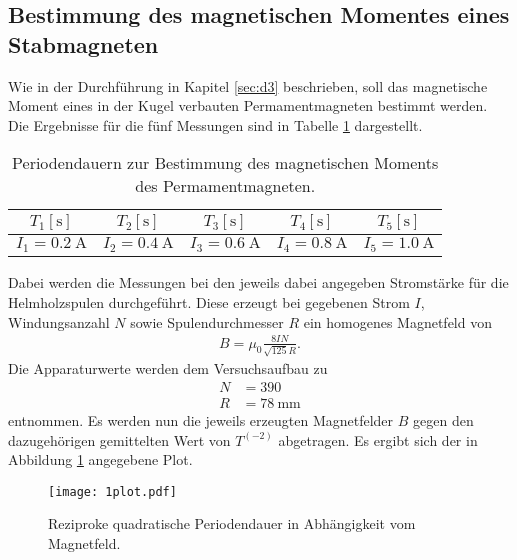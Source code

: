 \subsection{Bestimmung des magnetischen Momentes eines Stabmagneten}
Wie in der Durchführung in Kapitel \ref{sec:d3} beschrieben, soll das magnetische Moment eines in der Kugel verbauten Permamentmagneten bestimmt werden.
Die Ergebnisse für die fünf Messungen sind in Tabelle \ref{tab:4} dargestellt.
\begin{table}[H]
  \centering
  \caption{Periodendauern zur Bestimmung des magnetischen Moments des Permamentmagneten.}
  \label{tab:4}
  \begin{tabular}{c c c c c}
    \toprule
    {$T_{1} [\si{\second}]$} & {$T_{2} [\si{\second}]$} & {$T_{3} [\si{\second}]$} & {$T_{4} [\si{\second}]$} & {$T_{5} [\si{\second}]$}\\
    \midrule
    
    \midrule
    {$I_1 = \SI{0.2}{\ampere}$} & {$I_2 = \SI{0.4}{\ampere}$} & {$I_3 = \SI{0.6}{\ampere}$} & {$I_4 = \SI{0.8}{\ampere}$} & {$I_5 = \SI{1.0}{\ampere}$} \\
    \bottomrule
  \end{tabular}
\end{table}
Dabei werden die Messungen bei den jeweils dabei angegeben Stromstärke für die Helmholzspulen durchgeführt.
Diese erzeugt bei gegebenen Strom $I$, Windungsanzahl $N$ sowie Spulendurchmesser $R$ ein homogenes Magnetfeld von
\begin{align}
  B = \mu_0 \frac{8 I N}{\sqrt{125} R}.
\end{align}
Die Apparaturwerte werden dem Versuchsaufbau zu
\begin{align*}
  N &= 390 \\
  R &= \SI{78}{\milli\metre}
\end{align*}
entnommen.
Es werden nun die jeweils erzeugten Magnetfelder $B$ gegen den dazugehörigen gemittelten Wert von $T^(-2)$ abgetragen.
Es ergibt sich der in Abbildung \ref{fig:a1} angegebene Plot.

\begin{figure}[H]
  \centering
  \texttt{[image: 1plot.pdf]}
  \caption{Reziproke quadratische Periodendauer in Abhängigkeit vom Magnetfeld.}
  \label{fig:a1}
\end{figure}

